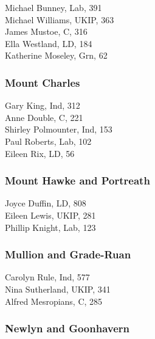\documentclass[a4paper,openany,10pt]{book}
\begin{document}
Michael Bunney, Lab, 391\\
Michael Williams, UKIP, 363\\
James Mustoe, C, 316\\
Ella Westland, LD, 184\\
Katherine Moseley, Grn, 62\\


\subsubsection*{Mount Charles}



Gary King, Ind, 312\\
Anne Double, C, 221\\
Shirley Polmounter, Ind, 153\\
Paul Roberts, Lab, 102\\
Eileen Rix, LD, 56\\


\subsubsection*{Mount Hawke and Portreath}



Joyce Duffin, LD, 808\\
Eileen Lewis, UKIP, 281\\
Phillip Knight, Lab, 123\\


\subsubsection*{Mullion and Grade-Ruan}



Carolyn Rule, Ind, 577\\
Nina Sutherland, UKIP, 341\\
Alfred Mesropians, C, 285\\


\subsubsection*{Newlyn and Goonhavern}

\end{document}
